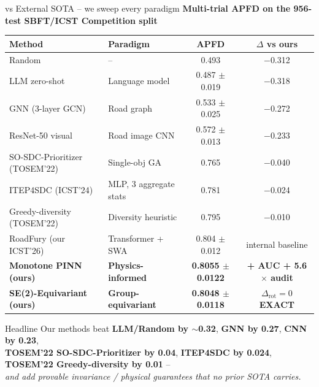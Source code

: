 \documentclass[aspectratio=169,10pt]{beamer}
\begin{document}
\begin{frame}{vs External SOTA -- we sweep every paradigm}
\centering\tiny
\textbf{Multi-trial APFD on the 956-test SBFT/ICST Competition split}\\[0.4em]
\begin{tabular}{l l c c}
  \toprule
  \textbf{Method} & \textbf{Paradigm} & \textbf{APFD} & \textbf{$\Delta$ vs ours} \\
  \midrule
  Random                                & --                          & 0.493             & \textcolor{alert}{$-$0.312} \\
  LLM zero-shot                         & Language model              & 0.487 $\pm$ 0.019 & \textcolor{alert}{$-$0.318} \\
  GNN (3-layer GCN)                     & Road graph                  & 0.533 $\pm$ 0.025 & \textcolor{alert}{$-$0.272} \\
  ResNet-50 visual                      & Road image CNN              & 0.572 $\pm$ 0.013 & \textcolor{alert}{$-$0.233} \\
  SO-SDC-Prioritizer (TOSEM'22)         & Single-obj GA               & 0.765             & \textcolor{alert}{$-$0.040} \\
  ITEP4SDC (ICST'24)                    & MLP, 3 aggregate stats      & 0.781             & \textcolor{alert}{$-$0.024} \\
  Greedy-diversity (TOSEM'22)           & Diversity heuristic         & 0.795             & \textcolor{alert}{$-$0.010} \\
  RoadFury (our ICST'26)                & Transformer + SWA           & 0.804 $\pm$ 0.012 & internal baseline \\
  \rowcolor{accent!15}
  \textbf{Monotone PINN (ours)}         & \textbf{Physics-informed}   & \textbf{0.8055 $\pm$ 0.0122} & \cellcolor{success!15}\textbf{+ AUC + 5.6$\times$ audit} \\
  \rowcolor{accent!15}
  \textbf{SE(2)-Equivariant (ours)}     & \textbf{Group-equivariant}  & \textbf{0.8048 $\pm$ 0.0118} & \cellcolor{success!15}\textbf{$\Delta_{\text{rot}}=0$ EXACT} \\
  \bottomrule
\end{tabular}

\vspace{0.7em}
\begin{exampleblock}{Headline}
\scriptsize\centering
Our methods beat \textbf{LLM/Random by $\sim$0.32}, \textbf{GNN by 0.27}, \textbf{CNN by 0.23},\\
\textbf{TOSEM'22 SO-SDC-Prioritizer by 0.04}, \textbf{ITEP4SDC by 0.024}, \textbf{TOSEM'22 Greedy-diversity by 0.01} --\\
\emph{and add provable invariance / physical guarantees that no prior SOTA carries.}
\end{exampleblock}
\end{frame}
\end{document}
